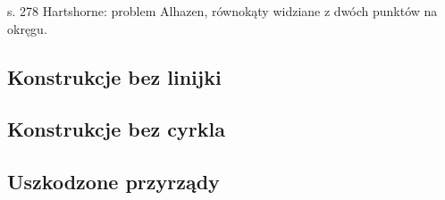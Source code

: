 s. 278 Hartshorne: problem Alhazen, równokąty widziane z dwóch punktów na okręgu.

\subsection{Konstrukcje bez linijki}




\subsection{Konstrukcje bez cyrkla}


\subsection{Uszkodzone przyrządy}


%




